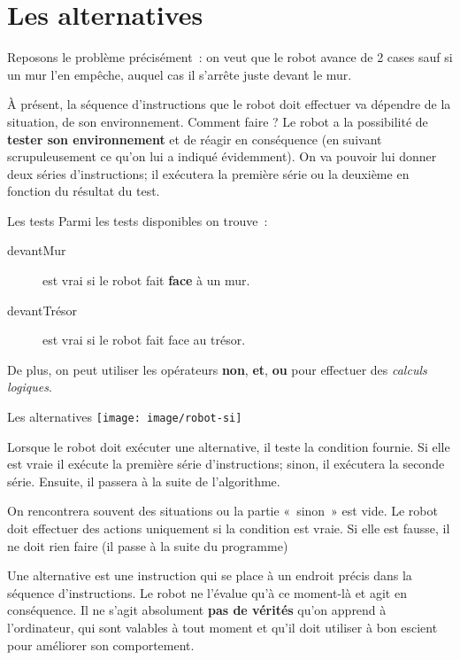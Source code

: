 \section{Les alternatives }

	Reposons le problème précisément~: on veut que le robot avance de 2
	cases sauf si un mur l'en empêche, auquel cas il
	s'arrête juste devant le mur.
	
	À présent, la séquence d'instructions que le robot doit
	effectuer va dépendre de la situation, de son environnement. Comment
	faire ? Le robot a la possibilité de \textbf{tester son environnement}
	et de réagir en conséquence (en suivant scrupuleusement ce
	qu'on lui a indiqué évidemment). On va pouvoir lui
	donner deux séries d'instructions; il exécutera la
	première série ou la deuxième en fonction du résultat du test.

	\begin{Emphase}[definition]{Les tests}
	Parmi les tests disponibles on trouve~:
	
		\begin{description}
		\item[devantMur]
			est vrai si le robot fait \textbf{face} à un mur.
		\item[devantTrésor]
			est vrai si le robot fait face au trésor.
		\end{description}
	\end{Emphase}

	De plus, on peut utiliser les opérateurs \textbf{non}, \textbf{et}, 
	\textbf{ou} pour effectuer des \emph{calculs logiques}.
	
	\begin{Emphase}[definition]{Les alternatives}
	\texttt{[image: image/robot-si]}
	\end{Emphase}

	Lorsque le robot doit exécuter une alternative, il teste la condition
	fournie. Si elle est vraie il exécute la première série
	d'instructions; sinon, il exécutera la seconde série.
	Ensuite, il passera à la suite de l'algorithme.

	On rencontrera souvent des situations ou la partie «~sinon~» est vide.
	Le robot doit effectuer des actions uniquement si la condition est
	vraie. Si elle est fausse, il ne doit rien faire (il passe à la suite
	du programme)

	Une alternative est une instruction qui se place à un endroit précis
	dans la séquence d'instructions. Le robot ne
	l'évalue qu'à ce moment-là et agit en
	conséquence. Il ne s'agit absolument \textbf{pas de
	vérités} qu'on apprend à
	l'ordinateur, qui sont valables à tout moment et
	qu'il doit utiliser à bon escient pour améliorer son
	comportement.

